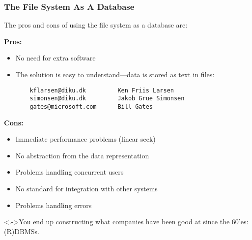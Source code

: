 \documentclass[dvipsnames,handout]{beamer}
\begin{document}
\begin{frame}[fragile]
\frametitle{The File System As A Database} 

The pros and cons of using the file system as a database are:

\textbf{Pros:}

\begin{itemize}
\item No need for extra software
\item The solution is easy to understand---data is stored as text in files:
\begin{footnotesize}
\begin{verbatim}
    kflarsen@diku.dk         Ken Friis Larsen
    simonsen@diku.dk         Jakob Grue Simonsen
    gates@microsoft.com      Bill Gates
\end{verbatim}
\end{footnotesize}
\end{itemize}


\textbf<+->{Cons:}

\begin{itemize}
\item<+-> Immediate performance problems (linear seek)
\item<+-> No abstraction from the data representation
\item<+-> Problems handling concurrent users
\item<+-> No standard for integration with other systems
\item<+-> Problems handling errors
\end{itemize}

\uncover<.->{You end up constructing what companies have been good at since the
60'es: (R)DBMSs.
}
\end{frame}
\end{document}
